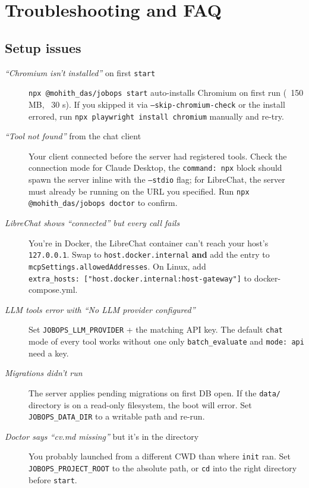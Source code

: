 \documentclass[11pt,letterpaper]{article}
\newcommand{\tool}[1]{\texttt{#1}}
\newcommand{\flag}[1]{\texttt{#1}}
\newcommand{\fpath}[1]{\texttt{#1}}
\newcommand{\env}[1]{\texttt{#1}}
\newcommand{\cmd}[1]{\texttt{#1}}
\begin{document}
\section{Troubleshooting and FAQ}

\subsection*{Setup issues}

\begin{description}
\item[\textit{``Chromium isn't installed''} on first \texttt{start}] \texttt{npx @mohith\_das/jobops start} auto-installs Chromium on first run (~150 MB, ~30 s). If you skipped it via \cmd{--skip-chromium-check} or the install errored, run \cmd{npx playwright install chromium} manually and re-try.

\item[\textit{``Tool not found''} from the chat client] Your client connected before the server had registered tools. Check the connection mode \textemdash{} for Claude Desktop, the \texttt{command: npx} block should spawn the server inline with the \flag{--stdio} flag; for LibreChat, the server must already be running on the URL you specified. Run \cmd{npx @mohith\_das/jobops doctor} to confirm.

\item[\textit{LibreChat shows ``connected'' but every call fails}] You're in Docker, the LibreChat container can't reach your host's \texttt{127.0.0.1}. Swap to \texttt{host.docker.internal} \textbf{and} add the entry to \texttt{mcpSettings.allowedAddresses}. On Linux, add \texttt{extra\_hosts:\ ["host.docker.internal:host-gateway"]} to docker-compose.yml.

\item[\textit{LLM tools error with ``No LLM provider configured''}] Set \env{JOBOPS\_LLM\_PROVIDER} + the matching API key. The default \texttt{chat} mode of every tool works without one \textemdash{} only \tool{batch\_evaluate} and \texttt{mode: api} need a key.

\item[\textit{Migrations didn't run}] The server applies pending migrations on first DB open. If the \fpath{data/} directory is on a read-only filesystem, the boot will error. Set \env{JOBOPS\_DATA\_DIR} to a writable path and re-run.

\item[\textit{Doctor says ``cv.md missing''} but it's in the directory] You probably launched from a different CWD than where \cmd{init} ran. Set \env{JOBOPS\_PROJECT\_ROOT} to the absolute path, or \cmd{cd} into the right directory before \cmd{start}.
\end{description}
\end{document}
